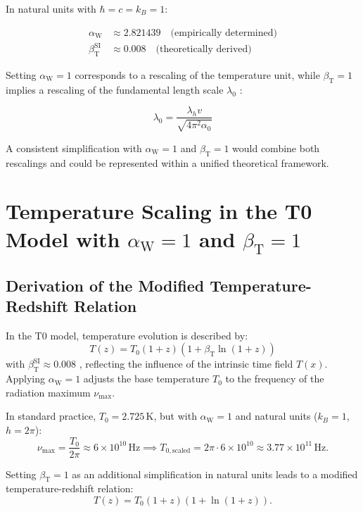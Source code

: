 \documentclass[12pt,a4paper]{article}
\newcommand{\Tfield}{T(x)}
\newcommand{\betaT}{\beta_{\text{T}}}
\newcommand{\alphaW}{\alpha_{\text{W}}}
\begin{document}
	In natural units with \(\hbar = c = k_B = 1\):
	
	\begin{align}
		\alphaW &\approx 2.821439 \quad \text{(empirically determined)} \\
		\betaT^{\text{SI}} &\approx 0.008 \quad \text{(theoretically derived)}
	\end{align}
	
	Setting \(\alphaW = 1\) corresponds to a rescaling of the temperature unit, while \(\betaT = 1\) implies a rescaling of the fundamental length scale \(\lambda_0\) \cite{pascher_params_2025}:
	
	\begin{equation}
		\lambda_0 = \frac{\lambda_h v}{\sqrt{4\pi^2 \alpha_0}}
	\end{equation}
	
	A consistent simplification with \(\alphaW = 1\) and \(\betaT = 1\) would combine both rescalings and could be represented within a unified theoretical framework.
	
	\section{Temperature Scaling in the T0 Model with \(\alphaW = 1\) and \(\betaT = 1\)}
	
	\subsection{Derivation of the Modified Temperature-Redshift Relation}
	
	In the T0 model, temperature evolution is described by:
	\begin{equation}
		T(z) = T_0 (1 + z) (1 + \betaT \ln(1 + z))
	\end{equation}
	with \(\betaT^{\text{SI}} \approx 0.008\) \cite{pascher_messdifferenzen_2025}, reflecting the influence of the intrinsic time field \(\Tfield\). Applying \(\alphaW = 1\) adjusts the base temperature \(T_0\) to the frequency of the radiation maximum \(\nu_{\text{max}}\).
	
	In standard practice, \(T_0 = 2.725 \, \text{K}\), but with \(\alphaW = 1\) and natural units (\(k_B = 1\), \(h = 2\pi\)):
	\[
	\nu_{\text{max}} = \frac{T_0}{2\pi} \approx 6 \times 10^{10} \, \text{Hz} \implies T_{0,\text{scaled}} = 2\pi \cdot 6 \times 10^{10} \approx 3.77 \times 10^{11} \, \text{Hz}.
	\]
	
	Setting \(\betaT = 1\) as an additional simplification in natural units leads to a modified temperature-redshift relation:
	\[
	T(z) = T_0 (1 + z) (1 + \ln(1 + z)).
	\]
	
\end{document}
